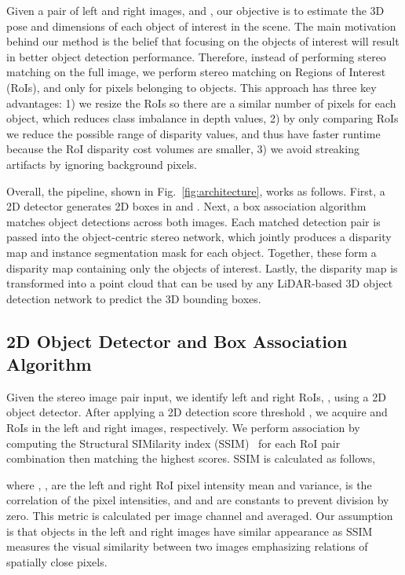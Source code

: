 \documentclass[letterpaper, 10 pt, conference]{ieeeconf}
\begin{document}
Given a pair of left and right images,  and , our objective is to estimate the 3D pose and dimensions of each object of interest in the scene. The main motivation behind our method is the belief that focusing on the objects of interest will result in better object detection performance. Therefore, instead of performing stereo matching on the full image, we perform stereo matching on Regions of Interest (RoIs), and only for pixels belonging to objects. This approach has three key advantages: 1) we resize the RoIs so there are a similar number of pixels for each object, which reduces class imbalance in depth values, 2) by only comparing RoIs we reduce the possible range of disparity values, and thus have faster runtime because the RoI disparity cost volumes are smaller, 3) we avoid streaking artifacts by ignoring background pixels.

Overall, the pipeline, shown in Fig.~\ref{fig:architecture}, works as follows. First, a 2D detector generates 2D boxes in  and . Next, a box association algorithm matches object detections across both images. Each matched detection pair is passed into the object-centric stereo network, which jointly produces a disparity map and instance segmentation mask for each object. Together, these form a disparity map containing only the objects of interest. Lastly, the disparity map is transformed into a point cloud that can be used by any LiDAR-based 3D object detection network to predict the 3D bounding boxes.

\subsection{2D Object Detector and Box Association Algorithm}

Given the stereo image pair input, we identify left and right RoIs, , using a 2D object detector. After applying a 2D detection score threshold , we acquire  and  RoIs in the left and right images, respectively. We perform association by computing the Structural SIMilarity index (SSIM)~\cite{wang2004image} for each RoI pair combination then matching the highest scores. SSIM is calculated as follows,

where , , are the left and right RoI pixel intensity mean and variance,  is the correlation of the pixel intensities, and  and  are constants to prevent division by zero. This metric is calculated per image channel and averaged. Our assumption is that objects in the left and right images have similar appearance as SSIM measures the visual similarity between two images emphasizing relations of spatially close pixels.
\end{document}
